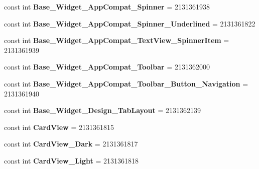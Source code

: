 \begin{DoxyCompactItemize}
\mbox{\label{classXaria_1_1Resource_1_1Style_a880e8ae4fc66d6b91c3e6e75b5b28f7a}} 
const int {\bfseries Base\+\_\+\+Widget\+\_\+\+App\+Compat\+\_\+\+Spinner} = 2131361938
\item 
\mbox{\label{classXaria_1_1Resource_1_1Style_a63dc8166f4b60c2a1be8dc3313da2990}} 
const int {\bfseries Base\+\_\+\+Widget\+\_\+\+App\+Compat\+\_\+\+Spinner\+\_\+\+Underlined} = 2131361822
\item 
\mbox{\label{classXaria_1_1Resource_1_1Style_aa8c5f605951febc5e004ea1cecc38106}} 
const int {\bfseries Base\+\_\+\+Widget\+\_\+\+App\+Compat\+\_\+\+Text\+View\+\_\+\+Spinner\+Item} = 2131361939
\item 
\mbox{\label{classXaria_1_1Resource_1_1Style_a7623da12899aa8f416460f911ab45850}} 
const int {\bfseries Base\+\_\+\+Widget\+\_\+\+App\+Compat\+\_\+\+Toolbar} = 2131362000
\item 
\mbox{\label{classXaria_1_1Resource_1_1Style_a4c0194d980e3576f814f2a23e30324fe}} 
const int {\bfseries Base\+\_\+\+Widget\+\_\+\+App\+Compat\+\_\+\+Toolbar\+\_\+\+Button\+\_\+\+Navigation} = 2131361940
\item 
\mbox{\label{classXaria_1_1Resource_1_1Style_ac58e16ba946c887e1287ad80f4d65c05}} 
const int {\bfseries Base\+\_\+\+Widget\+\_\+\+Design\+\_\+\+Tab\+Layout} = 2131362139
\item 
\mbox{\label{classXaria_1_1Resource_1_1Style_ab735236a6ba6d4cfb364cd082a25c229}} 
const int {\bfseries Card\+View} = 2131361815
\item 
\mbox{\label{classXaria_1_1Resource_1_1Style_a4f5293147cd6de57e1374739e53d26e7}} 
const int {\bfseries Card\+View\+\_\+\+Dark} = 2131361817
\item 
\mbox{\label{classXaria_1_1Resource_1_1Style_aff709298cc7df3ff51b62615306b717a}} 
const int {\bfseries Card\+View\+\_\+\+Light} = 2131361818
\item 

\end{DoxyCompactItemize}
